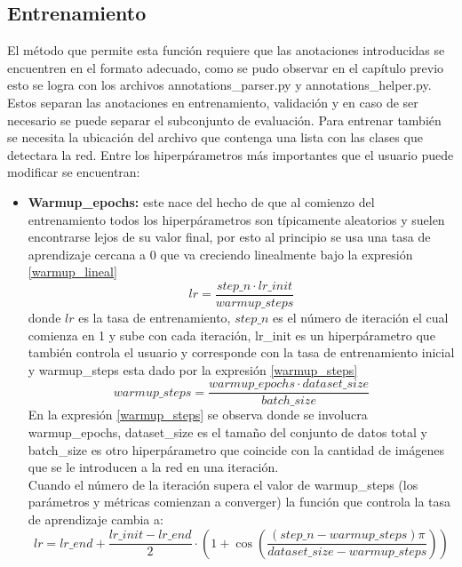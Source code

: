 \subsection{Entrenamiento} 
El método que permite esta función requiere que las anotaciones introducidas se encuentren en el formato adecuado, como se pudo observar en el capítulo previo esto se logra con los archivos annotations\_parser.py y annotations\_helper.py. Estos separan las anotaciones en entrenamiento, validación y en caso de ser necesario se puede separar el subconjunto de evaluación. Para entrenar también se necesita la ubicación del archivo que contenga una lista con las clases que detectara la red. Entre los hiperpárametros más importantes que el usuario puede modificar se encuentran:
\begin{itemize}
    \item \textbf{Warmup\_epochs:} este nace del hecho de que al comienzo del entrenamiento todos los hiperpárametros son típicamente aleatorios y suelen encontrarse lejos de su valor final, por esto al principio se usa una tasa de aprendizaje cercana a 0 que va creciendo linealmente bajo la expresión \ref{warmup_lineal}
    \begin{equation}
        lr = \frac{step\_n \cdot lr\_init}{warmup\_steps}\label{warmup_lineal}
    \end{equation}
    donde $lr$ es la tasa de entrenamiento, $step\_n$ es el número de iteración el cual comienza en 1 y sube con cada iteración, lr\_init es un hiperpárametro que también controla el usuario y corresponde con la tasa de entrenamiento inicial y warmup\_steps esta dado por la expresión \ref{warmup_steps}
    \begin{equation}
        warmup\_steps = \frac{warmup\_epochs \cdot dataset\_size}{batch\_size} \label{warmup_steps}
    \end{equation}
    En la expresión \ref{warmup_steps} se observa donde se involucra warmup\_epochs, dataset\_size es el tamaño del conjunto de datos total y batch\_size es otro hiperpárametro que coincide con la cantidad de imágenes que se le introducen a la red en una iteración. 
    \\
    Cuando el número de la iteración supera el valor de warmup\_steps (los parámetros y métricas comienzan a converger) la función que controla la tasa de aprendizaje cambia a:
    \begin{equation}
        lr = lr\_end + \frac{lr\_init - lr\_end}{2}\cdot \left(1 + \cos\left(\frac{(step\_n - warmup\_steps)\pi}{dataset\_size - warmup\_steps}\right) \right) \label{lr_cos}

\end{equation}
\end{itemize}
